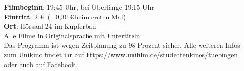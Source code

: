 \textbf{Filmbeginn}: 19:45 Uhr, bei Überlänge 19:15 Uhr\\
\textbf{Eintritt}: 2 \euro ~(+0,30 \euro beim ersten Mal)\\
\textbf{Ort}: Hörsaal 24 im Kupferbau\\
Alle Filme in Originalsprache mit Untertiteln\\

Das Programm ist wegen Zeitplanung zu 98 Prozent sicher.
Alle weiteren Infos zum Unikino findet ihr auf \url{https://www.unifilm.de/studentenkinos/tuebingen} oder auch auf Facebook.